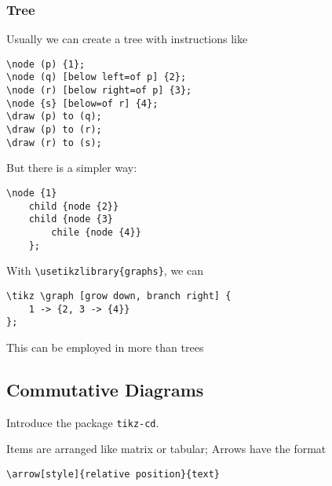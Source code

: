 \documentclass[english]{../TeXTemplate/pkupaper}
\begin{document}
\subsubsection{Tree}
Usually we can create a tree with instructions like
\begin{verbatim}
\node (p) {1};
\node (q) [below left=of p] {2};
\node (r) [below right=of p] {3};
\node {s} [below=of r] {4};
\draw (p) to (q);
\draw (p) to (r);
\draw (r) to (s);
\end{verbatim}
But there is a simpler way:
\begin{verbatim}
\node {1}
    child {node {2}}
    child {node {3}
        chile {node {4}}
    };
\end{verbatim}
With \verb"\usetikzlibrary{graphs}", we can
\begin{verbatim}
\tikz \graph [grow down, branch right] {
    1 -> {2, 3 -> {4}}
};
\end{verbatim}
This can be employed in more than trees
\begin{center}
\end{center}

\subsection{Commutative Diagrams}
Introduce the package \verb"tikz-cd".
\begin{center}
\end{center}
Items are arranged like matrix or tabular; Arrows
have the format 
\begin{verbatim}
\arrow[style]{relative position}{text}
\end{verbatim}
\end{document}
